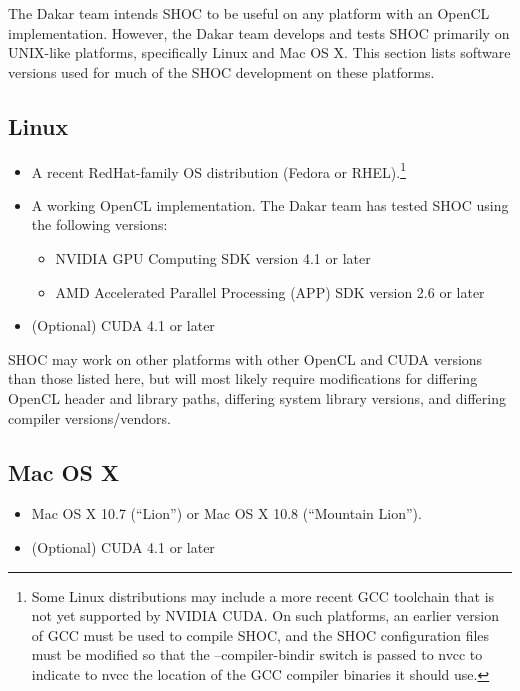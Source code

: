 \documentclass[11pt]{article}
\begin{document}
The Dakar team intends SHOC to be useful on any platform with an
OpenCL implementation. However, the Dakar team develops and tests
SHOC primarily on UNIX-like platforms, specifically Linux and
Mac OS X.
This section lists software versions used for much of the SHOC development
on these platforms.

\subsection{Linux}

\begin{itemize}
\item A recent RedHat-family OS distribution (Fedora or RHEL).\footnote{
Some Linux distributions may include a more recent GCC toolchain that is
not yet supported by NVIDIA CUDA.  On such platforms, an earlier version of GCC
must be used to compile SHOC, and the SHOC configuration files must be
modified so that the --compiler-bindir switch is passed to nvcc to 
indicate to nvcc the location of the GCC compiler binaries it should use.}
\item A working OpenCL implementation. The Dakar team has tested SHOC
using the following versions:
    \begin{itemize}
        \item NVIDIA GPU Computing SDK version 4.1 or later
        \item AMD Accelerated Parallel Processing (APP) SDK version 2.6 or later
    \end{itemize}
\item (Optional) CUDA 4.1 or later
\end{itemize}

SHOC may work on other platforms with other OpenCL and CUDA versions
than those listed here, but will most likely require modifications for
differing OpenCL header and library paths, differing system library versions,
and differing compiler versions/vendors.

\subsection{Mac OS X}

\begin{itemize}
\item Mac OS X 10.7 (``Lion'') or Mac OS X 10.8 (``Mountain Lion'').
\item (Optional) CUDA 4.1 or later
\end{itemize}
\end{document}
